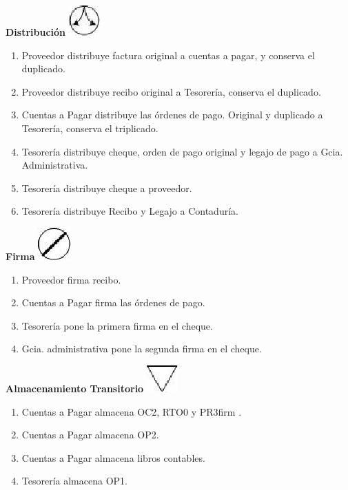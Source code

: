 \begin{center}
  \textbf{Distribución}
  \includegraphics{./Images/Simbolos/simbolo-Distribucion.png}
\end{center}
\begin{enumerate}
  \item Proveedor distribuye factura original a cuentas a pagar, y conserva el duplicado.
  \item Proveedor distribuye recibo original a Tesorería, conserva el duplicado.
  \item Cuentas a Pagar distribuye las órdenes de pago. Original y duplicado a Tesorería, conserva el triplicado.
  \item Tesorería distribuye cheque, orden de pago original y legajo de pago a Gcia. Administrativa.
  \item Tesorería distribuye cheque a proveedor.
  \item Tesorería distribuye  Recibo y Legajo a Contaduría.
\end{enumerate}

\begin{center}
  \textbf{Firma}
  \includegraphics{./Images/Simbolos/simbolo-Firma.png}
\end{center}
\begin{enumerate}
  \item Proveedor firma recibo.
  \item Cuentas a Pagar firma las órdenes de pago.
  \item Tesorería pone la primera firma en el cheque.
  \item Gcia. administrativa pone la segunda firma en el cheque.
\end{enumerate}

\begin{center}
  \textbf{Almacenamiento Transitorio}
  \includegraphics{./Images/Simbolos/simbolo-Almacenamiento-Transitorio.png}
\end{center}
\begin{enumerate}
  \item Cuentas a Pagar almacena OC2, RTO0 y PR3firm .
  \item Cuentas a Pagar almacena OP2.
  \item Cuentas a Pagar almacena libros contables.
  \item Tesorería almacena OP1.
\end{enumerate}


